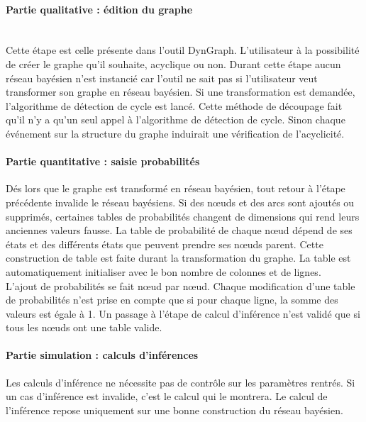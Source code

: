 \documentclass[conference]{IEEEtran}
\begin{document}
\paragraph{Partie qualitative : édition du graphe \\} \\
Cette étape est celle présente dans l'outil DynGraph. L'utilisateur à la possibilité de créer le graphe qu'il souhaite, acyclique ou non. Durant cette étape aucun réseau bayésien n'est instancié car  l'outil ne sait pas si l'utilisateur veut transformer son graphe en réseau bayésien. Si une transformation est demandée, l'algorithme de détection de cycle est lancé. Cette méthode de découpage fait qu'il n'y a qu'un seul appel à l'algorithme de détection de cycle. Sinon chaque événement sur la structure du graphe induirait une vérification de l'acyclicité. \\

\paragraph{Partie quantitative : saisie probabilités \\ }
Dés lors que le graphe est transformé en réseau bayésien, tout retour à l'étape précédente invalide le réseau bayésiens. Si des nœuds et des arcs sont ajoutés ou supprimés, certaines tables de probabilités changent de dimensions qui rend leurs anciennes valeurs fausse. La table de probabilité de chaque nœud dépend de ses états et des différents états que peuvent prendre ses nœuds parent. Cette construction de table est faite durant la transformation du graphe. La table est automatiquement initialiser avec le bon nombre de colonnes et de lignes. \\
L'ajout de probabilités se fait nœud par nœud. Chaque modification d'une table de probabilités n'est prise en compte que si pour chaque ligne, la somme des valeurs est égale à 1. 
Un passage à l'étape de calcul d'inférence n'est validé que si tous les nœuds ont une table valide. \\

\paragraph{Partie simulation : calculs d'inférences \\}
Les calculs d'inférence ne nécessite pas de contrôle sur les paramètres rentrés. Si un cas d'inférence est invalide, c'est le calcul qui le montrera. Le calcul de l'inférence repose uniquement sur une bonne construction du réseau bayésien. 
\end{document}
